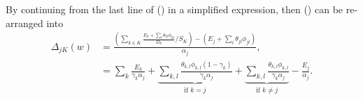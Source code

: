 \documentclass[12pt]{article}
\def\D{\displaystyle}
\begin{document}
By continuing from the last line of () in a simplified expression, then () can be re-arranged into
\begin{equation}
    \label{eq:delta_split}
    \begin{split}
        \Delta_{jK}(w)&= \frac{\D \left(\sum_{k\in K} \frac{E_k + \sum_l \theta_{kl} \phi_{kl}}{D_k} / S_K\right) - \left(E_j + \sum_l \theta_{jl} \phi_{jl}\right)}{\alpha_j}, \\
        &= \sum_k \frac{E_k}{\gamma_k\alpha_j} + \underbrace{\sum_{k,l} \frac{\theta_{k,l} \phi_{k,l} (1-\gamma_k)}{\gamma_k\alpha_j}}_{\text{if }k=j} +  \underbrace{\sum_{k,l} \frac{\theta_{k,l} \phi_{k,l}}{\gamma_k\alpha_j}}_{\text{if }k \neq j} - \frac{E_j}{\alpha_j}.\\
    \end{split}
\end{equation}
\iffalse
In order to see the general pattern of (\refeq{eq:delta}), let us see a simple example with $j = 1$, $|K| = 2$, and $L = 2$; and using simplified expressions by omitting the arguments
\begin{equation*}
    \begin{split}
        D_k &:= D_k(w), \\
        S_K &:= S_K(w), \\
        \phi_{k,l} &:= \phi_{k,l}(w),
    \end{split}
\end{equation*}
hence
\begin{equation}
    \begin{split}
        \Delta_{1,K}(w)&:= \frac{\D \frac{ E_1 + \theta_{1,1}\phi_{1,1} + \theta_{1,2}\phi_{1,2}}{D_1S_K} + \frac{E_2 + \theta_{2,1}\phi_{2,1} + \theta_{2,2}\phi_{2,2}}{D_2S_K} - (E_1 + \theta_{1,1}\phi_{1,1} + \theta_{1,2}\phi_{1,2})}{D_1S_K-1} \\
        &= \D \frac{ E_1 + \theta_{1,1}\phi_{1,1} + \theta_{1,2}\phi_{1,2}}{D_1S_K(D_1S_K-1)} + \frac{E_2 + \theta_{2,1}\phi_{2,1} + \theta_{2,2}\phi_{2,2}}{D_2S_K(D_1S_K-1)} - \frac{(E_1 + \theta_{1,1}\phi_{1,1} + \theta_{1,2}\phi_{1,2})}{D_1S_K-1} \\
        &= \dots
    \end{split}
\end{equation}
\fi
\end{document}
